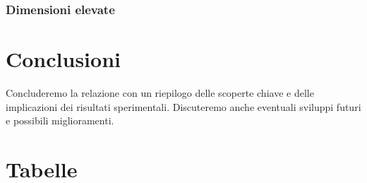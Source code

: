 \documentclass[onecolumn]{article}
\begin{document}
\subsubsection{Dimensioni elevate}

\section{Conclusioni}

Concluderemo la relazione con un riepilogo delle scoperte chiave e delle implicazioni dei risultati sperimentali. Discuteremo anche eventuali sviluppi futuri e possibili miglioramenti.

\newpage

\twocolumn
\section{Tabelle}
\vspace{2.75em}



\end{document}
